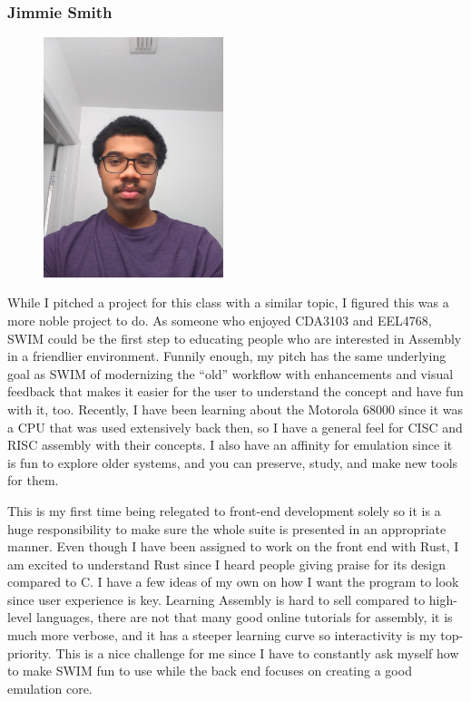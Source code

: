 \documentclass[
    paper=letter,
    parskip=half,
    fontsize=12pt,
    titlepage=firstiscover,
    toc=bibliography,
    numbers=endperiod
]{scrartcl}
\begin{document}
\subsubsection{Jimmie Smith}
\begin{figure}[H]
    \includegraphics[height=7cm]{profile-jimmie}
\end{figure}

While I pitched a project for this class with a similar topic, I figured
this was a more noble project to do. As someone who enjoyed CDA3103 and
EEL4768, SWIM could be the first step to educating people who are
interested in Assembly in a friendlier environment. Funnily enough, my
pitch has the same underlying goal as SWIM of modernizing the “old”
workflow with enhancements and visual feedback that makes it easier for
the user to understand the concept and have fun with it, too. Recently,
I have been learning about the Motorola 68000 since it was a CPU that
was used extensively back then, so I have a general feel for CISC and
RISC assembly with their concepts. I also have an affinity for emulation
since it is fun to explore older systems, and you can preserve, study,
and make new tools for them.

This is my first time being relegated to front-end development solely so
it is a huge responsibility to make sure the whole suite is presented in
an appropriate manner. Even though I have been assigned to work on the
front end with Rust, I am excited to understand Rust since I heard
people giving praise for its design compared to C. I have a few ideas of
my own on how I want the program to look since user experience is key.
Learning Assembly is hard to sell compared to high-level languages,
there are not that many good online tutorials for assembly, it is much
more verbose, and it has a steeper learning curve so interactivity is my
top-priority. This is a nice challenge for me since I have to constantly
ask myself how to make SWIM fun to use while the back end focuses on
creating a good emulation core.
\end{document}
